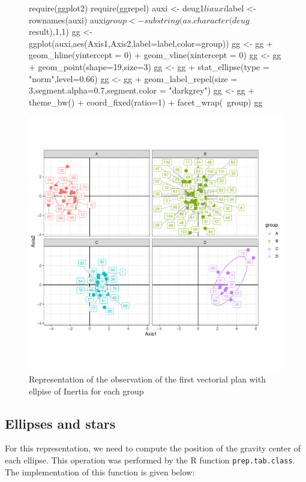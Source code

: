 \documentclass[a4paper,10pt]{article}
\begin{document}
\begin{figure}[H]
\begin{center}
\begin{Schunk}
\begin{Sinput}
  require(ggplot2)
  require(ggrepel)
  auxi <- deug1$li
  auxi$label <- rownames(auxi)
  auxi$group <- substring(as.character(deug$result),1,1)
  gg <- ggplot(auxi,aes(Axis1,Axis2,label=label,color=group))
  gg <- gg + geom_hline(yintercept = 0) + geom_vline(xintercept = 0)
  gg <- gg + geom_point(shape=19,size=3)
  gg <- gg + stat_ellipse(type = "norm",level=0.66)
  gg <- gg + geom_label_repel(size = 3,segment.alpha=0.7,segment.color = "darkgrey")
  gg <-  gg + theme_bw() + coord_fixed(ratio=1) + facet_wrap(~group)
  gg
\end{Sinput}
\end{Schunk}
\includegraphics{figs/sweave-liclass4}
\caption{Representation of the observation of the first vectorial plan with ellpise of Inertia for each group}
\label{fig:liclass4}
\end{center}
\end{figure}

\subsection{Ellipses and stars}
For this representation, we need to compute the position of the gravity center of each ellipse. This operation was performed by the R function \texttt{prep.tab.class}. The implementation of this function is given below:
\end{document}
